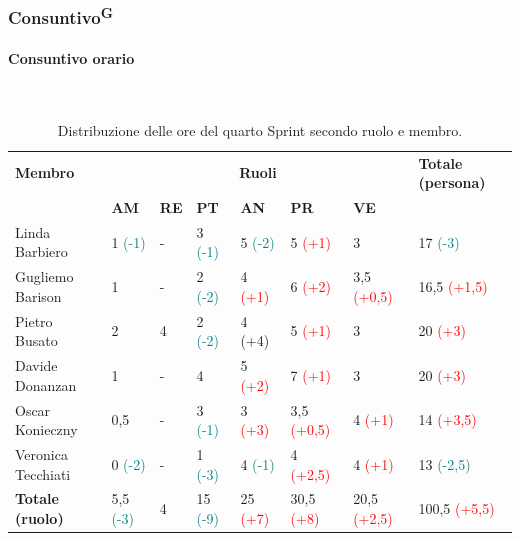 \documentclass[8pt]{article}
\newcommand{\glossterm}[1]{#1\textsuperscript{G}} %
\newcommand{\subsubsubsection}[1]{\paragraph{#1}\mbox{}\\}
\begin{document}
\subsubsection{\glossterm{Consuntivo}}
\subsubsubsection{Consuntivo orario}
\begin{table}[ht!]
	\centering
	\begin{tabular}{p{3.1cm}*{6}{l}p{3cm}}
		\toprule
		\textbf{Membro} & \multicolumn{6}{c}{\textbf{Ruoli}} & \textbf{Totale
        (persona)}\\
		& \textbf{AM} & \textbf{RE} & \textbf{PT} & \textbf{AN} & \textbf{PR} & \textbf{VE}\\
		\midrule
        Linda Barbiero & 1 \textcolor{teal}{(-1)} & - & 3 \textcolor{teal}{(-1)} & 5 \textcolor{teal}{(-2)} & 5 \textcolor{red}{(+1)} & 3 & 17 \textcolor{teal}{(-3)} \\ 
        Gugliemo Barison & 1 & - & 2 \textcolor{teal}{(-2)} & 4 \textcolor{red}{(+1)} & 6 \textcolor{red}{(+2)} & 3,5 \textcolor{red}{(+0,5)} & 16,5 \textcolor{red}{(+1,5)} \\ 
        Pietro Busato & 2 & 4 & 2 \textcolor{teal}{(-2)} & 4 (+4) & 5 \textcolor{red}{(+1)} & 3 & 20 \textcolor{red}{(+3)} \\ 
        Davide Donanzan & 1 & - & 4 & 5 \textcolor{red}{(+2)} & 7 \textcolor{red}{(+1)} & 3 & 20 \textcolor{red}{(+3)} \\ 
        Oscar Konieczny & 0,5 & - & 3 \textcolor{teal}{(-1)} & 3 \textcolor{red}{(+3)} & 3,5 \textcolor{red}{(+0,5)} & 4 \textcolor{red}{(+1)} & 14 \textcolor{red}{(+3,5)} \\ 
        Veronica Tecchiati & 0 \textcolor{teal}{(-2)} & - & 1 \textcolor{teal}{(-3)} & 4 \textcolor{teal}{(-1)} & 4 \textcolor{red}{(+2,5)} & 4 \textcolor{red}{(+1)} & 13 \textcolor{teal}{(-2,5)} \\ 
        \midrule
        \textbf{Totale (ruolo)} & 5,5 \textcolor{teal}{(-3)} & 4 & 15 \textcolor{teal}{(-9)} & 25 \textcolor{red}{(+7)} & 30,5 \textcolor{red}{(+8)} & 20,5 \textcolor{red}{(+2,5)} & 100,5 \textcolor{red}{(+5,5)} \\ 
        \bottomrule
    \end{tabular}
	\caption{Distribuzione delle ore del quarto Sprint secondo ruolo e membro.}
	\label{table:Distribuzione delle ore del quarto Sprint secondo ruolo e membr}
\end{table}
\end{document}
